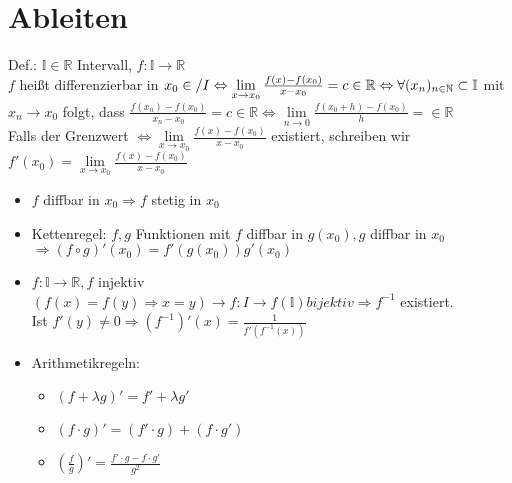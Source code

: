 \documentclass[10pt,a4paper^, twocolumn]{article}
\newcommand{\R}{\mathbb{R}}
\newcommand{\N}{\mathbb{N}}
\newcommand{\I}{\mathbb{I}}
\begin{document}
\section{Ableiten}
	Def.: $\I \in \R$ Intervall, $f: \I \to \R$ \\
	$f$ heißt differenzierbar in $x_0 \in /I \\
	\Leftrightarrow \lim\limits_{x \to x_0} \frac{f(x) - f(x_0)}{x - x_0} = c \in \R \\
	\Leftrightarrow \forall (x_n)_{n \in \N} \subset \I$ mit $x_n \to x_0$ folgt, dass $\frac{f(x_n) - f(x_0)}{x_n-x_0} = c \in \R
	\Leftrightarrow \lim\limits_{n \to 0} \frac{f(x_0 + h)-f(x_0)}{h} = \in \R$ \\
	Falls der Grenzwert 
	$\Leftrightarrow \lim\limits_{x \to x_0} \frac{f(x) - f(x_0)}{x - x_0}$ existiert,
	schreiben wir $f'(x_0) = \lim\limits_{x \to x_0} \frac{f(x) - f(x_0)}{x - x_0}$
	\begin{itemize}
	\item $f$ diffbar in $x_0 \Rightarrow f$ stetig in $x_0$
	\item Kettenregel: $f,g$ Funktionen mit $f$ diffbar in $g(x_0), g$ diffbar in $x_0$
		$\Rightarrow (f \circ g)'(x_0) = f'(g(x_0))g'(x_0)$
	\item $f: \I \to \R, f$ injektiv $(f(x) = f(y) \Rightarrow x=y) \rightarrow f:I \to f(\I) bijektiv \Rightarrow f^{-1}$ existiert. \\
		Ist $f'(y) \neq 0 \Rightarrow (f^{-1})'(x) = \frac{1}{f'(f^{-1}(x))}$
	\item Arithmetikregeln:
		\begin{itemize}
		\item $(f + \lambda g)' = f' + \lambda g'$
		\item $(f \cdot g)' = (f' \cdot g) + (f \cdot g')$
		\item $(\frac{f}{g})' = \frac{f'\cdot g - f \cdot g'}{g^2}$
		\end{itemize}
	\end{itemize}
\end{document}
